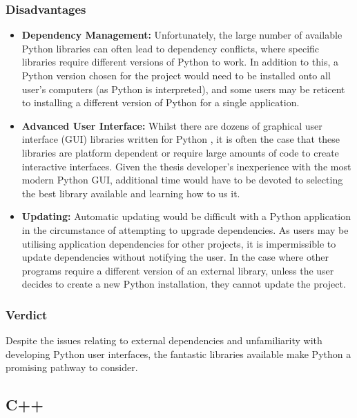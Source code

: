 \documentclass[titlesmallcaps, examinerscopy, copyrightpage]{uqthesis}
\begin{document}
\subsubsection{Disadvantages}

\begin{itemize}
\item \textbf{Dependency Management:} Unfortunately, the large number of available Python libraries can often lead to dependency conflicts, where specific libraries require different versions of Python to work. In addition to this, a Python version chosen for the project would need to be installed onto all user's computers (as Python is interpreted), and some users may be reticent to installing a different version of Python for a single application.

\item \textbf{Advanced User Interface:} Whilst there are dozens of graphical user interface (GUI) libraries written for Python \cite{PythonGUI}, it is often the case that these libraries are platform dependent or require large amounts of code to create interactive interfaces. Given the thesis developer's inexperience with the most modern Python GUI, additional time would have to be devoted to selecting the best library available and learning how to us it.

\item \textbf{Updating:} Automatic updating would be difficult with a Python application in the circumstance of attempting to upgrade dependencies. As users may be utilising application dependencies for other projects, it is impermissible to update dependencies without notifying the user. In the case where other programs require a different version of an external library, unless the user decides to create a new Python installation, they cannot update the project.

\end{itemize}

\subsubsection{Verdict}

Despite the issues relating to external dependencies and unfamiliarity with developing Python user interfaces, the fantastic libraries available make Python a promising pathway to consider.


\subsection{C++}
\end{document}
